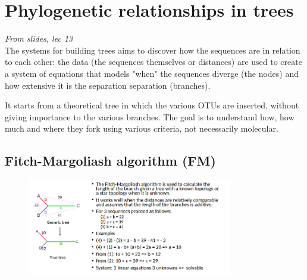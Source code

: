 \section{Phylogenetic relationships in trees}
\emph{From slides, lec 13}
\\ 
The systems for building trees aims to discover how the sequences are in
relation to each other: the data (the sequences themselves or distances) are used to create a system of equations that models "when" the sequences diverge (the nodes) and how extensive it is the separation separation (branches).

It starts from a theoretical tree in which the various OTUs are inserted, without giving importance to the various branches. The goal is to understand how, how much and where they fork using various criteria, not necessarily molecular.

\subsection{Fitch-Margoliash algorithm (FM)}
\begin{figure}[H]
		\centering
		\includegraphics[width=0.8\textwidth]{ex1.png}
		\caption{}
		\label{fig:ex1}
	\end{figure}
















